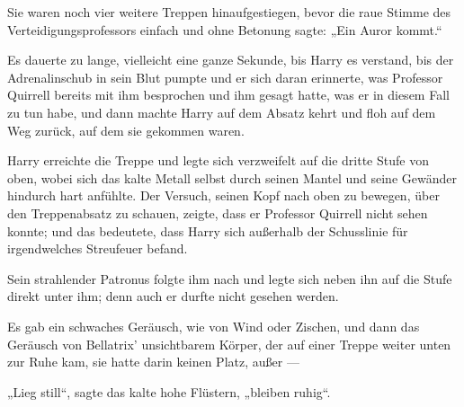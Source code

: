 Sie waren noch vier weitere Treppen hinaufgestiegen, bevor die raue Stimme des Verteidigungsprofessors einfach und ohne Betonung sagte:
„Ein Auror kommt.“

Es dauerte zu lange, vielleicht eine ganze Sekunde, bis Harry es verstand, bis der Adrenalinschub in sein Blut pumpte und er sich daran erinnerte, was Professor Quirrell bereits mit ihm besprochen und ihm gesagt hatte, was er in diesem Fall zu tun habe, und dann machte Harry auf dem Absatz kehrt und floh auf dem Weg zurück, auf dem sie gekommen waren.

Harry erreichte die Treppe und legte sich verzweifelt auf die dritte Stufe von oben, wobei sich das kalte Metall selbst durch seinen Mantel und seine Gewänder hindurch hart anfühlte. Der Versuch, seinen Kopf nach oben zu bewegen, über den Treppenabsatz zu schauen, zeigte, dass er Professor Quirrell nicht sehen konnte; und das bedeutete, dass Harry sich außerhalb der Schusslinie für irgendwelches Streufeuer befand.

Sein strahlender Patronus folgte ihm nach und legte sich neben ihn auf die Stufe direkt unter ihm; denn auch er durfte nicht gesehen werden.

Es gab ein schwaches Geräusch, wie von Wind oder Zischen, und dann das Geräusch von Bellatrix’ unsichtbarem Körper, der auf einer Treppe weiter unten zur Ruhe kam, sie hatte darin keinen Platz, außer —

„Lieg still“, sagte das kalte hohe Flüstern, „bleiben ruhig“.

